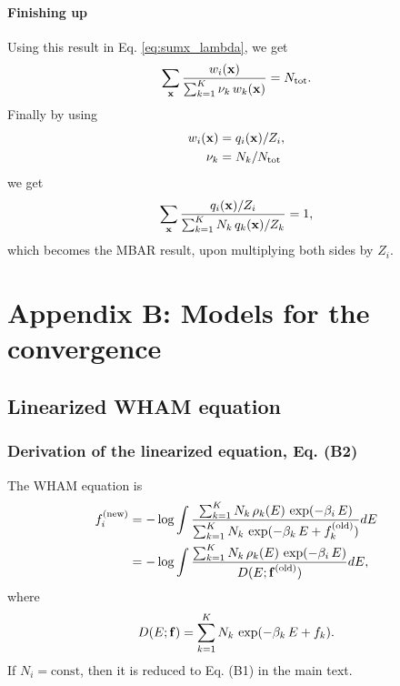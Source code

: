 \documentclass[aip,jcp,preprint,notitlepage, superscriptaddress]{revtex4-1}
\begin{document}
\paragraph{Finishing up}


Using this result in Eq. \eqref{eq:sumx_lambda},
we get
%
\begin{equation*}
  \sum_{ \bm{\mathrm{x}}}
    \frac{
      w_i(\bm{\mathrm{x}})
    }
    {
      \sum_{k = 1}^K \nu_k \, w_k(\bm{\mathrm{x}})
    }
    = N_\mathrm{tot}.
\end{equation*}
%
Finally by using
\begin{align*}
  w_i(\bm{\mathrm{x}}) &= q_i(\bm{\mathrm{x}}) / Z_i, \\
  \nu_k    &= N_k / N_\mathrm{tot}
\end{align*}
we get
\begin{equation*}
  \sum_{ \bm{\mathrm{x}} }
  \frac{ q_i(\bm{\mathrm{x}}) / Z_i }
  { \sum_{k = 1}^K N_k \, q_k(\bm{\mathrm{x}}) / Z_k }
  = 1,
\end{equation*}
which becomes the MBAR result,
upon multiplying both sides by $Z_i$.





\section{Appendix B: Models for the convergence}






\subsection{Linearized WHAM equation}


\subsubsection{Derivation of the linearized equation, Eq. (B2)}



The WHAM equation is
%
\begin{align}
f_i^\mathrm{(new)}
&=
-\log
\int
\frac
{
  \sum_{k=1}^K
    N_k \, \rho_k(E) \, \exp(-\beta_i \, E)
}
{
  \sum_{k=1}^K
    N_k \, \exp( -\beta_k \, E + f_k^\mathrm{(old)} )
}
dE
\notag \\
&=
-\log
\int
\frac
{
  \sum_{k=1}^K N_k \, \rho_k(E) \, \exp(-\beta_i \, E)
}
{
  D(E; \bm{\mathrm{f}}^\mathrm{(old)})
}
dE,
\label{eq:f_WHAM1}
\end{align}
%
where
%
\begin{align}
D(E; \bm{\mathrm{f}})
=
\sum_{k=1}^K N_k \, \exp(-\beta_k \, E + f_k).
\end{align}
%
If $N_i = \mathrm{const}$, then it is reduced to Eq. (B1) in the main text.
\end{document}
